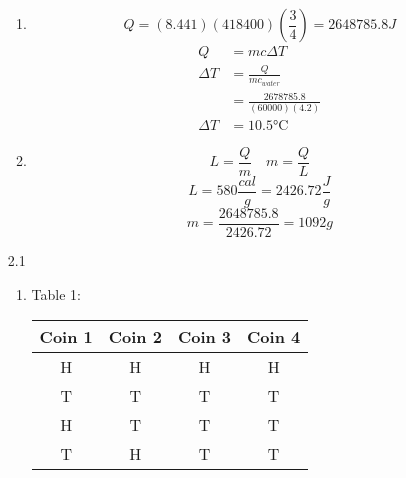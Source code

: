 \documentclass{article}
\begin{document}
\begin{enumerate}
\begin{enumerate}
        \item
            \begin{equation*}
                Q = (8.441)(418400) \left( \frac{3}{4} \right) = 2648785.8 J
            \end{equation*}
            \begin{align*}
                Q &= mc \Delta T \\
                \Delta T &= \frac{Q}{mc_{water}} \\
                &= \frac{2678785.8}{(60000)(4.2)} \\
                \Delta T &= 10.5\si{\celsius}
            \end{align*}
        \vspace{0.05in}
        \item
            \begin{equation*}
                L = \frac{Q}{m} \quad m = \frac{Q}{L}
            \end{equation*}
            \begin{equation*}
                L = 580 \frac{cal}{g} = 2426.72 \frac{J}{g}
            \end{equation*}
            \begin{equation*}
                m = \frac{2648785.8}{2426.72} = 1092 g
            \end{equation*}
    \end{enumerate}
    \vspace{0.1in}
    \item [2.1]
    \begin{enumerate}
        \item
        Table 1: \\
            \begin{center}
                \begin{tabular}{ |c|c|c|c| }
                    \hline
                    Coin 1 & Coin 2 & Coin 3 & Coin 4 \\
                    \hline
                    H & H & H & H \\
                    T & T & T & T \\
                    H & T & T & T \\
                    T & H & T & T \\

\end{tabular}
\end{center}
\end{enumerate}
\end{enumerate}
\end{document}
